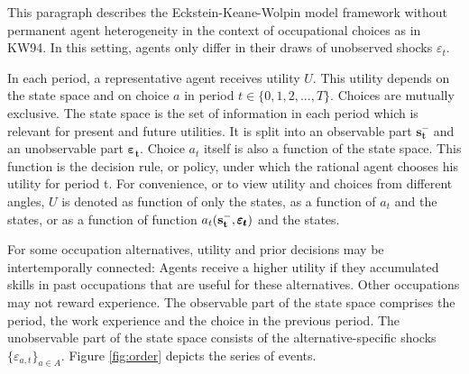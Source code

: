 \noindent
This paragraph describes the Eckstein-Keane-Wolpin model framework without permanent agent heterogeneity in the context of occupational choices as in KW94. In this setting, agents only differ in their draws of unobserved shocks $\varepsilon_t$.

In each period, a representative agent receives utility $U$. This utility depends on the state space and on choice $a$ in period $t \in \{0,1,2,...,T\}$. Choices are mutually exclusive. The state space is the set of information in each period which is relevant for present and future utilities. It is split into an observable part $\bm{s_t^-}$ and an unobservable part $\pmb{\varepsilon_{t}}$. Choice $a_t$ itself is also a function of the state space. This function is the decision rule, or policy, under which the rational agent chooses his utility for period t. For convenience, or to view utility and choices from different angles, $U$ is denoted as function of only the states, as a function of $a_t$ and the states, or as a function of function $a_t(\bold{s_t^-}, \pmb{\varepsilon_t})$ and the states.

For some occupation alternatives, utility and prior decisions may be intertemporally connected: Agents receive a higher utility if they accumulated skills in past occupations that are useful for these alternatives. Other occupations may not reward experience. The observable part of the state space comprises the period, the work experience and the choice in the previous period. The unobservable part of the state space consists of the alternative-specific shocks $\{\varepsilon_{a,t}\}_{a \in A}$. Figure \ref{fig:order} depicts the series of events.






